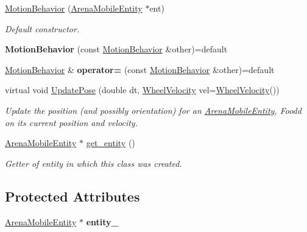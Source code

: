 \begin{DoxyCompactItemize}
\item 
\hyperlink{classMotionBehavior_aa2d5f7d563f4fdb5702edb8367eaa6e7}{Motion\+Behavior} (\hyperlink{classArenaMobileEntity}{Arena\+Mobile\+Entity} $\ast$ent)\hypertarget{classMotionBehavior_aa2d5f7d563f4fdb5702edb8367eaa6e7}{}\label{classMotionBehavior_aa2d5f7d563f4fdb5702edb8367eaa6e7}

\begin{DoxyCompactList}\small\item\em Default constructor. \end{DoxyCompactList}\item 
{\bfseries Motion\+Behavior} (const \hyperlink{classMotionBehavior}{Motion\+Behavior} \&other)=default\hypertarget{classMotionBehavior_a5fe8e8a49e8cb34519a34ca652a23143}{}\label{classMotionBehavior_a5fe8e8a49e8cb34519a34ca652a23143}

\item 
\hyperlink{classMotionBehavior}{Motion\+Behavior} \& {\bfseries operator=} (const \hyperlink{classMotionBehavior}{Motion\+Behavior} \&other)=default\hypertarget{classMotionBehavior_a227057c1862c64bbc609705205473abc}{}\label{classMotionBehavior_a227057c1862c64bbc609705205473abc}

\item 
virtual void \hyperlink{classMotionBehavior_a804f440bb7f03f19abec79a1ab671494}{Update\+Pose} (double dt, \hyperlink{structWheelVelocity}{Wheel\+Velocity} vel=\hyperlink{structWheelVelocity}{Wheel\+Velocity}())
\begin{DoxyCompactList}\small\item\em Update the position (and possibly orientation) for an \hyperlink{classArenaMobileEntity}{Arena\+Mobile\+Entity}, Foodd on its current position and velocity. \end{DoxyCompactList}\item 
\hyperlink{classArenaMobileEntity}{Arena\+Mobile\+Entity} $\ast$ \hyperlink{classMotionBehavior_a1daf82b16d312ba6f5f71178e7fafa79}{get\+\_\+entity} ()\hypertarget{classMotionBehavior_a1daf82b16d312ba6f5f71178e7fafa79}{}\label{classMotionBehavior_a1daf82b16d312ba6f5f71178e7fafa79}

\begin{DoxyCompactList}\small\item\em Getter of entity in which this class was created. \end{DoxyCompactList}\end{DoxyCompactItemize}
\subsection*{Protected Attributes}
\begin{DoxyCompactItemize}
\item 
\hyperlink{classArenaMobileEntity}{Arena\+Mobile\+Entity} $\ast$ {\bfseries entity\+\_\+}\hypertarget{classMotionBehavior_a9254cf197657a2a52d89dbc01da31b8f}{}\label{classMotionBehavior_a9254cf197657a2a52d89dbc01da31b8f}

\end{DoxyCompactItemize}



